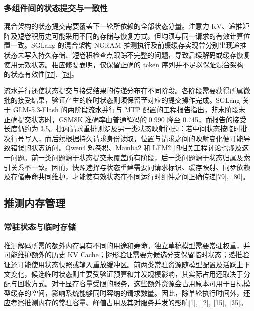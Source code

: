\documentclass[11pt,a4paper,UTF8,fontset=none,scheme=plain,zihao=-4]{ctexart}
\begin{document}
\hypertarget{section-5-1-3}{%
\subsubsection{多组件间的状态提交与一致性}\label{section-5-1-3}}

混合架构的状态提交需要覆盖下一轮所依赖的全部状态分量。注意力
KV、递推矩阵及短卷积历史可能采用不同的存储与恢复方式，但均须与同一请求的有效计算位置一致。SGLang
的混合架构 NGRAM
推测执行及前缀缓存实现曾分别出现递推状态未写入持久存储、短卷积检查点跟踪不完整的问题，导致后续解码或缓存恢复使用无效状态。相应修复表明，仅保留正确的
token
序列并不足以保证混合架构的状态有效性\protect\hyperlink{ref-sglngramcommit}{{[}77{]}},~\protect\hyperlink{ref-sglsconvcommit}{{[}78{]}}。

流水并行还使状态提交与接受结果的传递分布在不同阶段。各阶段需要获得所属微批的接受结果，验证产生的临时状态则须保留至对应的提交操作完成。SGLang
关于 GLM-5.3-Flash 的两阶段流水并行与 MTP
配置的工程报告指出，非末阶段未正确提交状态时，GSM8K 准确率由普通解码的
0.990 降至 0.745，而报告的接受长度仍约为
3.5。批内请求重排则涉及另一类状态映射问题：若中间状态按临时批次行号写入，而后续根据持久请求身份读取，位置与请求之间的映射变化便可能导致错误的状态访问。Qwen4
短卷积、Mamba2 和 LFM2
的相关工程讨论也涉及这一问题。前一类问题源于状态提交未覆盖所有阶段，后一类问题源于状态归属及索引关系不一致。因而，快照选择与状态重建需要同请求标识、缓存映射、同步依赖及存储寿命共同维护，才能使有效状态在不同运行时组件之间正确传递\protect\hyperlink{ref-sglppcommit}{{[}79{]}},~\protect\hyperlink{ref-sglpprows}{{[}80{]}}。

\hypertarget{section-5-2}{%
\subsection{推测内存管理}\label{section-5-2}}

\hypertarget{section-5-2-1}{%
\subsubsection{常驻状态与临时存储}\label{section-5-2-1}}

推测解码所需的额外内存具有不同的用途和寿命。独立草稿模型需要常驻权重，并可能维护额外的历史
KV
Cache；树形验证需要为候选分支保留临时状态；递推验证还可能使用状态快照或输入重放缓冲区。前两类常驻资源随模型配置及活跃上下文变化，候选临时状态则主要受验证预算和并发规模影响，其实际占用还取决于分配与回收方式。对于显存容量受限的服务，这些额外资源会占用原本可用于目标模型缓存的空间，影响系统能够同时容纳的请求数量。因此，除单轮执行时间外，还应考察推测内存的常驻容量、峰值占用及其对服务并发的影响\protect\hyperlink{ref-pagedattention}{{[}1{]}},~\protect\hyperlink{ref-magicdec}{{[}2{]}},~\protect\hyperlink{ref-replayssm}{{[}15{]}},~\protect\hyperlink{ref-sequoia}{{[}35{]}}。
\end{document}
